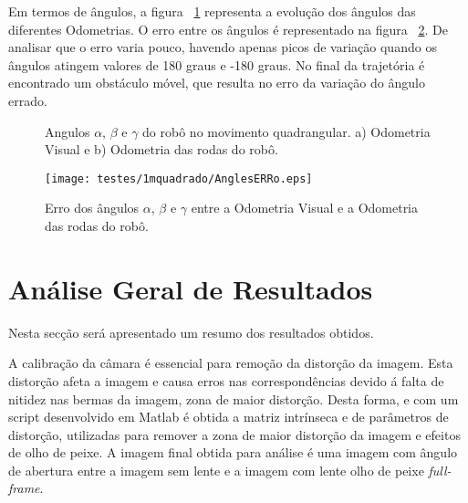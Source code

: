 Em termos de ângulos, a figura ~\ref{fig:ang1mquadrado} representa a evolução dos ângulos das diferentes Odometrias. O erro entre os ângulos é representado na figura ~\ref{fig:anglesERROquad}. De analisar que o erro varia pouco, havendo apenas picos de variação quando os ângulos atingem valores de 180 graus e -180 graus. No final da trajetória é encontrado um obstáculo móvel, que resulta no erro da variação do ângulo errado. 


\begin{figure}[h!]
	\centering
	\qquad
	\caption{Angulos $\alpha$, $\beta$ e $\gamma$ do robô  no movimento quadrangular. a) Odometria Visual e b) Odometria das rodas do robô.}
	\label{fig:ang1mquadrado}
\end{figure}

\begin{figure}[h!]
	\begin{center}
		\leavevmode		
		\texttt{[image: testes/1mquadrado/AnglesERRo.eps]}
		\caption{Erro dos ângulos $\alpha$, $\beta$ e $\gamma$ entre a Odometria Visual e a Odometria das rodas do robô.}
		\label{fig:anglesERROquad}
	\end{center}
\end{figure}





\section{Análise Geral de Resultados}


Nesta secção será apresentado um resumo dos resultados obtidos. 

A calibração da câmara é essencial para remoção da distorção da imagem. Esta distorção afeta a imagem e causa erros nas correspondências devido á falta de nitidez nas bermas da imagem, zona de maior distorção. Desta forma, e com um script desenvolvido em Matlab é obtida a matriz intrínseca e de parâmetros de distorção, utilizadas para remover a zona de maior distorção da imagem e efeitos de olho de peixe. A imagem final obtida para análise é uma imagem com ângulo de abertura entre a imagem sem lente e a imagem com lente olho de peixe \textit{full-frame}. 

